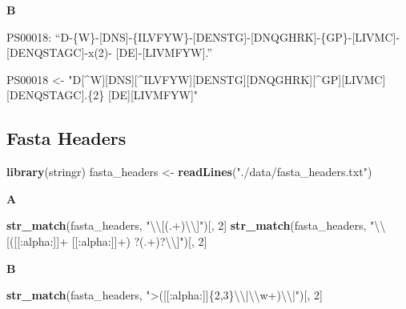 \documentclass[]{book}
\newenvironment{Shaded}{\begin{snugshade}}{\end{snugshade}}
\newcommand{\CharTok}[1]{\textcolor[rgb]{0.31,0.60,0.02}{#1}}
\newcommand{\DecValTok}[1]{\textcolor[rgb]{0.00,0.00,0.81}{#1}}
\newcommand{\KeywordTok}[1]{\textcolor[rgb]{0.13,0.29,0.53}{\textbf{#1}}}
\newcommand{\NormalTok}[1]{#1}
\newcommand{\StringTok}[1]{\textcolor[rgb]{0.31,0.60,0.02}{#1}}
\begin{document}
\textbf{B}

PS00018:
``D-\{W\}-{[}DNS{]}-\{ILVFYW\}-{[}DENSTG{]}-{[}DNQGHRK{]}-\{GP\}-{[}LIVMC{]}-{[}DENQSTAGC{]}-x(2)- {[}DE{]}-{[}LIVMFYW{]}.''

\begin{Shaded}
\begin{Highlighting}[]
\NormalTok{PS00018 <-}\StringTok{ "D[^W][DNS][^ILVFYW][DENSTG][DNQGHRK][^GP][LIVMC][DENQSTAGC].\{2\} [DE][LIVMFYW]"}
\end{Highlighting}
\end{Shaded}

\hypertarget{fasta-headers-1}{%
\subsection{Fasta Headers}\label{fasta-headers-1}}

\begin{Shaded}
\begin{Highlighting}[]
\KeywordTok{library}\NormalTok{(stringr)}
\NormalTok{fasta_headers <-}\StringTok{ }\KeywordTok{readLines}\NormalTok{(}\StringTok{"./data/fasta_headers.txt"}\NormalTok{)}
\end{Highlighting}
\end{Shaded}

\textbf{A}

\begin{Shaded}
\begin{Highlighting}[]
\KeywordTok{str_match}\NormalTok{(fasta_headers, }\StringTok{"}\CharTok{\textbackslash{}\textbackslash{}}\StringTok{[(.+)}\CharTok{\textbackslash{}\textbackslash{}}\StringTok{]"}\NormalTok{)[, }\DecValTok{2}\NormalTok{]}
\KeywordTok{str_match}\NormalTok{(fasta_headers, }\StringTok{"}\CharTok{\textbackslash{}\textbackslash{}}\StringTok{[([[:alpha:]]+ [[:alpha:]]+) ?(.+)?}\CharTok{\textbackslash{}\textbackslash{}}\StringTok{]"}\NormalTok{)[, }\DecValTok{2}\NormalTok{]}
\end{Highlighting}
\end{Shaded}

\textbf{B}

\begin{Shaded}
\begin{Highlighting}[]
\KeywordTok{str_match}\NormalTok{(fasta_headers, }\StringTok{">([[:alpha:]]\{2,3\}}\CharTok{\textbackslash{}\textbackslash{}}\StringTok{|}\CharTok{\textbackslash{}\textbackslash{}}\StringTok{w+)}\CharTok{\textbackslash{}\textbackslash{}}\StringTok{|"}\NormalTok{)[, }\DecValTok{2}\NormalTok{]}
\end{Highlighting}
\end{Shaded}
\end{document}
